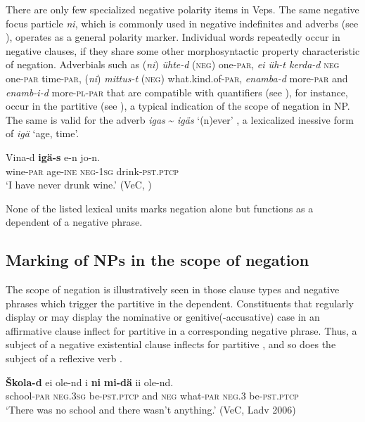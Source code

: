 \documentclass[output=paper,colorlinks=true, citecolor=brown]{langscibook}
\begin{document}
There are only few specialized negative polarity items in Veps. The same negative focus particle \textit{ni}, which is commonly used in negative indefinites and adverbs (see ), operates as a general polarity marker. Individual words repeatedly occur in negative clauses, if they share some other morphosyntactic property characteristic of negation. Adverbials such as (\textit{ni}) \textit{ühte-d} (\textsc{neg}) one-\textsc{par}, \textit{ei üh{}-t kerda{}-d} \textsc{neg} one-\textsc{par} time-\textsc{par}, (\textit{ni}) \textit{mittus{}-t} (\textsc{neg}) what.kind.of-\textsc{par}, \textit{enamba{}-d} more-\textsc{par} and \textit{enamb{}-i{}-d} more{}-\textsc{pl}{}-\textsc{par} that are compatible with quantifiers (see ), for instance, occur in the partitive (see ), a typical indication of the scope of negation in NP. The same is valid for the adverb \textit{igas} {\textasciitilde} \textit{igäs} ‘(n)ever’ , a lexicalized inessive form of \textit{igä} ‘age, time’.

\ea
    \label{ex:vep:79}
    \gll Vina{}-d  \textbf{igä{}-s} e{}-n jo{}-n.\\
        wine-\textsc{par} age{}-\textsc{ine} \textsc{neg-1sg} drink-\textsc{pst.ptcp} \\
    \glt ‘I have never drunk wine.’ (VeC, \citealt[57]{MSFOu70})
\z

None of the listed lexical units marks negation alone but functions as a dependent of a negative phrase.

\subsection{Marking of NPs in the scope of negation}\label{sec:vep:4.3}

The scope of negation is illustratively seen in those clause types and negative phrases which trigger the partitive in the dependent. Constituents that regularly display or may display the nominative or genitive(-accusative) case in an affirmative clause inflect for partitive in a corresponding negative phrase. Thus, a subject of a negative existential clause inflects for partitive , and so does the subject of a reflexive verb .

\ea
    \label{ex:vep:80}
    \gll  \textbf{Škola{}-d}  ei ole{}-nd i \textbf{ni} \textbf{mi{}-dä} ii ole{}-nd. \\
         school-\textsc{par} \textsc{neg.3sg} be-\textsc{pst.ptcp} and \textsc{neg}  what-\textsc{par} \textsc{neg.3} be-\textsc{pst.ptcp}\\
    \glt ‘There was no school and there wasn’t anything.’ (VeC, Ladv 2006)
\z 
\end{document}
